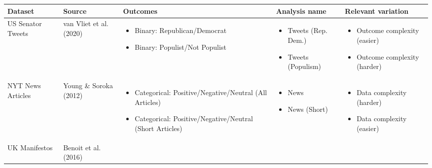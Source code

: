\documentclass{article}
\begin{document}
\begin{landscape}
\begin{table}[htbp]
    \centering
    \renewcommand{\arraystretch}{.5}
    \begin{tabular}{p{2cm}p{2cm}p{6cm}p{4cm}p{4cm}}
        \toprule
        \textbf{Dataset} & \textbf{Source} & \textbf{Outcomes} & \textbf{Analysis name} & \textbf{Relevant variation} \\
        \midrule
        US Senator Tweets & van Vliet et al. (2020) & \begin{itemize}[nosep,leftmargin=*]
            \item Binary: Republican/Democrat
            \item Binary: Populist/Not Populist
        \end{itemize} & \begin{itemize}[nosep,leftmargin=*]
            \item Tweets (Rep. Dem.)
            \item Tweets (Populism)
        \end{itemize} & \begin{itemize}[nosep,leftmargin=*]
            \item Outcome complexity (easier)
            \item Outcome complexity (harder)
        \end{itemize} \\
        \addlinespace[0.5em]
        NYT News Articles & Young \& Soroka (2012) & \begin{itemize}[nosep,leftmargin=*]
            \item Categorical: Positive/Negative/Neutral (All Articles)
            \item Categorical: Positive/Negative/Neutral (Short Articles)
        \end{itemize} & \begin{itemize}[nosep,leftmargin=*]
            \item News
            \item News (Short)
        \end{itemize} & \begin{itemize}[nosep,leftmargin=*]
            \item Data complexity (harder)
            \item Data complexity (easier)
        \end{itemize} \\
        \addlinespace[0.5em]
        UK Manifestos & Benoit et al. (2016) & \begin{itemize}[nosep,leftmargin=*]

\end{itemize}
\end{tabular}
\end{table}
\end{landscape}
\end{document}
